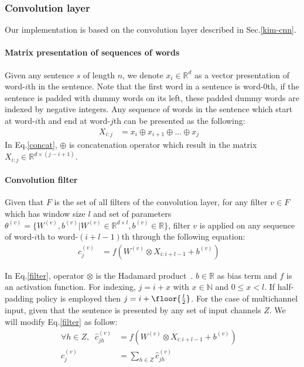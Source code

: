 \subsubsection{Convolution layer} \label{sec:conv1c}
Our implementation is based on the convolution layer described in Sec.\ref{kim-cnn}.
\paragraph{Matrix presentation of sequences of words}
Given any sentence \(s\) of length \(n\), we denote \(x_i \in \mathbb{R}^d\) as a vector presentation of word-\(i\)th in the sentence.
Note that the first word in a sentence is word-\(0\)th, if the sentence is padded with dummy words on its left, these padded dummy words are indexed by negative integers.
Any sequence of words in the sentence which start at word-\(i\)th and end at word-\(j\)th can be presented as the following:
\begin{align}
    X_{i:j} &= x_i \oplus x_{i+1} \oplus ... \oplus x_{j} &\label{concat}
\end{align}
In Eq.\eqref{concat}, \(\oplus\) is concatenation operator which result in the matrix \(X_{i:j} \in \mathbb{R}^{d \times (j-i+1)}\).

\paragraph{Convolution filter}
Given that \(F\) is the set of all filters of the convolution layer, for any filter \(v \in F\) which has window size \(l\) and set of parameters \(\theta^{(v)} = \{ W^{(v)}, b^{(v)} | W^{(v)} \in \mathbb{R}^{d \times l}, b^{(v)} \in \mathbb{R}\}\), filter \({v}\) is applied on any sequence of word-\(i\)th to word-\((i+l-1)\)th through the following equation:
\begin{align}
    c^{(v)}_j &= f(W^{(v)} \otimes X_{i:i+l-1} + b^{(v)}) &\label{filter}
\end{align}

In Eq.\eqref{filter}, operator \(\otimes\) is the Hadamard product~\cite{element-prod}.
\(b \in \mathbb{R}\) as bias term and \(f\) is an activation function.
For indexing, \(j = i + x\) with \(x \in \mathbb{N}\) and \(0 \leq x < l\).
If half-padding policy is employed then \(j = i + \floor{\frac{l}{2}}\).
For the case of multichannel input, given that the sentence is presented by any set of input channels \(Z\).
We will modify Eq.\eqref{filter} as follow:
\begin{align}
    \forall h \in Z, \; \; \hat{c}^{(v)}_{jh} &= f(W^{(v)} \otimes X_{i:i+l-1} + b^{(v)})& \\
    c^{(v)}_j &= \sum_{h \in Z} \hat{c}^{(v)}_{jh}&
\end{align}

